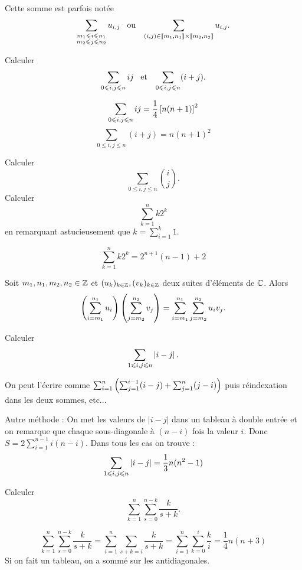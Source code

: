 \documentclass{magnolia}
\begin{document}
\begin{remarqueUnique}
\remarque Cette somme est parfois notée
\[\sum_{\substack{m_1 \leqslant i \leqslant n_1 \\ m_2 \leqslant j \leqslant n_2}} u_{i, j} \quad\!\text{ou}\quad\! 
  \sum_{(i,j) \in \left\llbracket m_1,n_1\right\rrbracket \times \left\llbracket m_2,n_2\right\rrbracket} u_{i, j}.\]
\end{remarqueUnique}

\begin{exos}
\exo Calculer
  \[\sum_{0 \leqslant i,j \leqslant n} ij \quad\!\text{et}\quad\!
    \sum_{0 \leqslant i,j \leqslant n} (i+j).\]
  \begin{sol}
\[\sum_{0 \leqslant i,j \leqslant n} ij=\frac{1}{4}\left[n(n+1)\right]^2\]
\[\sum_{0 \leq i,j \leq n} (i+j)=n(n+1)^2\]
  \end{sol}
\exo Calculer
  \[\sum_{0 \leq i,j \leq n} \binom{i}{j}.\]
\exo Calculer
  \[\sum_{k=1}^n k 2^k\]
  en remarquant astucieusement que $k=\sum_{i=1}^k 1$.
  \begin{sol}
  \[\sum_{k=1}^n k 2^k=2^{n+1}(n-1)+2\]
  \end{sol}
\end{exos}

\begin{proposition}
Soit $m_1,n_1,m_2,n_2\in\mathbb{Z}$ et $(u_k)_{k\in\mathbb{Z}}, (v_k)_{k\in\mathbb{Z}}$ deux suites d'éléments de $\mathbb{C}$. Alors
\[\left(\sum_{i=m_1}^{n_1} u_i\right)\left(\sum_{j=m_2}^{n_2} v_j\right)=\sum_{i=m_1}^{n_1} \sum_{j=m_2}^{n_2} u_i v_j.\]
\end{proposition}


\begin{exos}
\exo Calculer
  \[\sum_{1\leqslant i, j \leqslant n}\left|i-j\right|.\]
  \begin{sol}
  On peut l'écrire comme $\sum_{i=1}^n\left(\sum_{j=1}^{i-1}(i-j)+\sum_{j=1}^n(j-i)\right)$ puis réindexation dans les deux sommes, etc...
  
  Autre méthode : On met les valeurs de $|i-j|$ dans un tableau à double entrée et on remarque que chaque sous-diagonale à $(n-i)$ fois la valeur $i$. Donc $S=2\sum_{i=1}^{n-1}i(n-i)$. Dans tous les cas on trouve :
\[\sum_{1\leqslant i, j \leqslant n}\left|i-j\right|=\frac{1}{3}n(n^2-1)\]
  \end{sol}
\exo Calculer
  \[\sum_{k = 1}^n \sum_{s = 0}^{n-k} \dfrac{k}{s + k}.\]
  \begin{sol}
  
  
\[\sum_{k=1}^n \sum_{s=0}^{n-k} \frac{k}{s+k}=\sum_{i=1}^n\sum_{s+k=i}\frac{k}{s+k}=\sum_{i=1}^n\sum_{k=0}^{i}\frac{k}{i}=\frac{1}{4}n(n+3)\]
Si on fait un tableau, on a sommé sur les antidiagonales.
  \end{sol}
\end{exos}
\end{document}
